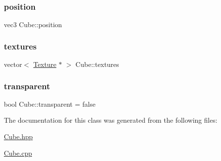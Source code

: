 \mbox{\label{classCube_a9b495ef759214f35fcc7f466ebfa64a9}} 
\subsubsection{\texorpdfstring{position}{position}}
{\footnotesize\ttfamily vec3 Cube\+::position}

\mbox{\label{classCube_a7c3516e41ce365ccad2d9bb9ed81ff10}} 
\subsubsection{\texorpdfstring{textures}{textures}}
{\footnotesize\ttfamily vector$<$ \mbox{\hyperlink{classTexture}{Texture}} $\ast$ $>$ Cube\+::textures\hspace{0.3cm}{\ttfamily [static]}}

\mbox{\label{classCube_ac7eda995b98581564cb8dbe3ccc9369d}} 
\subsubsection{\texorpdfstring{transparent}{transparent}}
{\footnotesize\ttfamily bool Cube\+::transparent = false}



The documentation for this class was generated from the following files\+:\begin{DoxyCompactItemize}
\item 
\mbox{\hyperlink{Cube_8hpp}{Cube.\+hpp}}\item 
\mbox{\hyperlink{Cube_8cpp}{Cube.\+cpp}}\end{DoxyCompactItemize}
